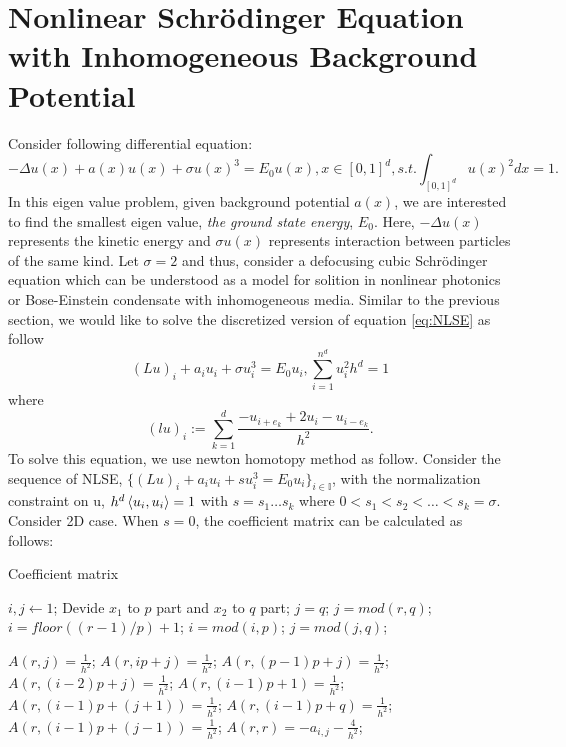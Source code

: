 \section{Nonlinear Schr\"{o}dinger Equation with Inhomogeneous Background Potential}
Consider following differential equation:
\begin{equation}
	-\Delta u(x) + a(x)u(x) + \sigma u(x)^3 = E_0 u(x), x\in [0,1]^d, s.t. \int_{[0,1]^d}u(x)^2 dx = 1.
	\label{eq:NLSE}
\end{equation}
In this eigen value problem, given background potential $a(x)$, we are interested to find the smallest eigen value, \textit{the ground state energy}, $E_0$. Here,  $-\Delta u(x)$ represents the kinetic energy and $\sigma u(x)$ represents interaction between particles of the same kind. Let $\sigma = 2$ and thus, consider a defocusing cubic Schr\"{o}dinger equation which can be understood as a model for solition in nonlinear photonics or Bose-Einstein condensate with inhomogeneous media. Similar to the previous section, we would like to solve the discretized version of equation \eqref{eq:NLSE} as follow
\begin{equation}
	(Lu)_i + a_i u_i + \sigma u_{i}^3 = E_0 u_i, \sum_{i=1}^{n^d} u_{i}^2 h^d = 1
\end{equation}
where
\begin{equation*}
	(lu)_i := \sum_{k=1}^{d} \frac{-u_{i+e_{k}} + 2u_i - u_{i-e_{k}}}{h^2}.
\end{equation*}
To solve this equation, we use newton homotopy method as follow. Consider the sequence of NLSE, $\{ (Lu)_i + a_i u_i + s u_{i}^{3} = E_0 u_i \}_{i \in \mathbb{I}}$, with the normalization constraint on u, $h^d \mathop{\langle u_i, u_i \rangle} = 1$ with $s = s_1\dots s_k$ where $0<s_1<s_2<\dots<s_k=\sigma$. Consider 2D case. When $s = 0$, the coefficient matrix can be calculated as follows:
\begin{algorithm}[H]
	\caption{Coefficient matrix} 
	\label{alg:NLSE_FDM_Matrix}
	\begin{algorithmic}[1]
		\State $i,j \leftarrow 1$;
		\State Devide $x_1$ to $p$ part and $x_2$ to $q$ part; 
		\State $j = q$;
		\Else 
		\State $j = mod(r,q)$;
		\EndIf
		\State $i = floor((r-1)/p)+1$;		
		\State $i = mod(i,p)$;
		\EndIf
		\State $j = mod(j,q)$;
		\EndIf
	\end{algorithmic}
\end{algorithm} 
\begin{algorithm}[H]
	\begin{algorithmic}[1]
		\State $A(r, j) = \frac{1}{h^2}$;
		\Else 
		\State $A(r, ip+j) = \frac{1}{h^2}$;
		\EndIf		
		\State $A(r, (p-1)p+j) = \frac{1}{h^2}$;
		\Else 
		\State $A(r, (i-2)p+j) = \frac{1}{h^2}$;
		\EndIf	
		\State $A(r, (i-1)p +1) = \frac{1}{h^2}$; 
		\Else 
		\State $A(r, (i-1)p+(j+1)) = \frac{1}{h^2}$;
		\EndIf	
		\State $A(r, (i-1)p+q) = \frac{1}{h^2}$;
		\Else 
		\State $A(r, (i-1)p+(j-1)) = \frac{1}{h^2}$;
		\EndIf		
		\State $A(r,r) = - a_{i,j} - \frac{4}{h^2}$;		
		\EndFor		
	\end{algorithmic}
\end{algorithm}
